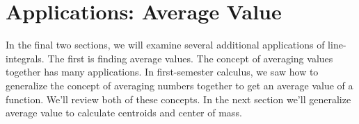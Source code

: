 %


\section{Applications: Average Value}

In the final two sections, we will examine several additional applications of line-integrals. The first is finding average values. The concept of averaging values together has many applications.  In first-semester calculus, we saw how to generalize the concept of averaging numbers together to get an average value of a function.  We'll review both of these concepts. In the next section we'll generalize average value to calculate centroids and center of mass.

